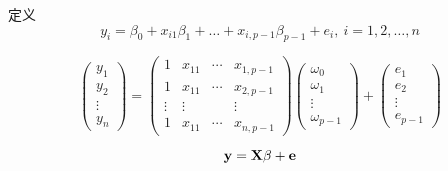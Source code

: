 \documentclass[xetex,mathserif,serif]{beamer}
\begin{document}
\begin{frame}{定义}
\[ y_i = \beta_0+x_{i1}\beta_1+ \dots + x_{i,p-1}\beta_{p-1}+e_i, \ i=1,2,\dots,n\]

\[\left( {\begin{array}{*{20}{c}}
{{y_1}}\\
{{y_2}}\\
 \vdots \\
{{y_n}}
\end{array}} \right) = \left( {\begin{array}{*{20}{c}}
1&{{x_{11}}}& \cdots &{{x_{1,p - 1}}}\\
1&{{x_{11}}}& \cdots &{{x_{2,p - 1}}}\\
 \vdots & \vdots &{}& \vdots \\
1&{{x_{11}}}& \cdots &{{x_{n,p - 1}}}
\end{array}} \right)\left( {\begin{array}{*{20}{c}}
{{\omega _0}}\\
{{\omega _1}}\\
 \vdots \\
{{\omega _{p - 1}}}
\end{array}} \right) + \left( {\begin{array}{*{20}{c}}
{{e_1}}\\
{{e_2}}\\
 \vdots \\
{{e_{p - 1}}}
\end{array}} \right)\]
\end{frame}

\[\bf{y}=\bf{X\beta}+\bf{e}\]
\end{document}
